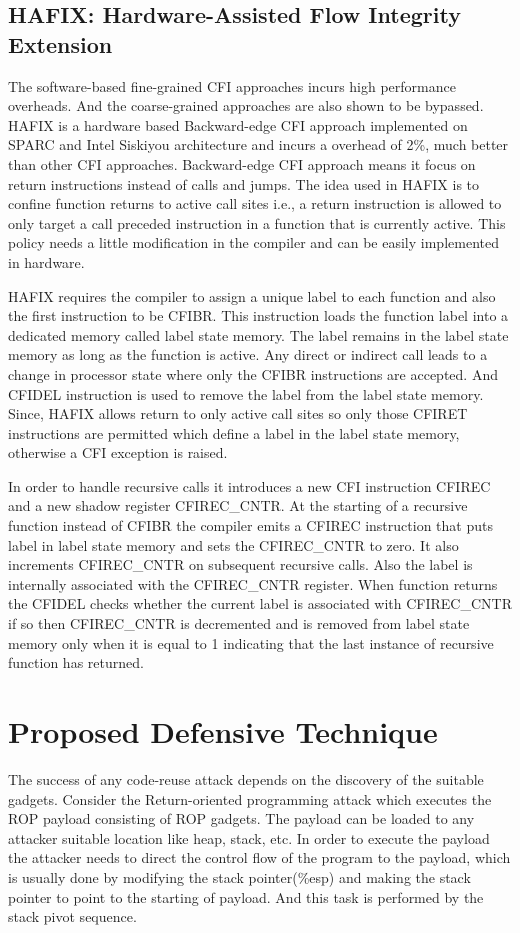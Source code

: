 \documentclass{article}
\begin{document}
\begin{multicols}{2}
	\subsection{HAFIX: Hardware-Assisted Flow Integrity Extension}
	The software-based fine-grained CFI approaches incurs high performance overheads. And the coarse-grained approaches are also shown to be bypassed. HAFIX is a hardware based Backward-edge CFI approach implemented on SPARC and Intel Siskiyou architecture and incurs a overhead of 2\%, much better than other CFI approaches. Backward-edge CFI approach means it focus on return instructions instead of calls and jumps. The idea used in HAFIX is to confine function returns to active call sites i.e., a return instruction is allowed to only target a call preceded instruction in a function that is currently active. This policy needs a little modification in the compiler and can be easily implemented in hardware.
	
	HAFIX requires the compiler to assign a unique label to each function and also the first instruction to be CFIBR. This instruction loads the function label into a dedicated memory called label state memory. The label remains in the label state memory as long as the function is active. Any direct or indirect call leads to a change in processor state where only the CFIBR instructions are accepted. And CFIDEL instruction is used to remove the label from the label state memory. Since, HAFIX allows return to only active call sites so only those CFIRET instructions are permitted which define a label in the label state memory, otherwise a CFI exception is raised.
	
	In order to handle recursive calls it introduces a new CFI instruction CFIREC and a new shadow register CFIREC\_CNTR. At the starting of a recursive function instead of CFIBR the compiler emits a CFIREC instruction that puts label in label state memory and sets the CFIREC\_CNTR to zero. It also increments CFIREC\_CNTR on subsequent recursive calls. Also the label is internally associated with the CFIREC\_CNTR register. When function returns the CFIDEL checks whether the current label is associated with CFIREC\_CNTR if so then CFIREC\_CNTR is decremented and is removed from label state memory only when it is equal to 1 indicating that the last instance of recursive function has returned.
	
	\section{Proposed Defensive Technique}
	The success of any code-reuse attack depends on the discovery of the suitable gadgets. Consider the Return-oriented programming attack which executes the ROP payload consisting of ROP gadgets. The payload can be loaded to any attacker suitable location like heap, stack, etc. In order to execute the payload the attacker needs to direct the control flow of the program to the payload, which is usually done by modifying the stack pointer(\%esp) and making the stack pointer to point to the starting of payload. And this task is performed by the stack pivot sequence.
	

\end{multicols}
\end{document}

